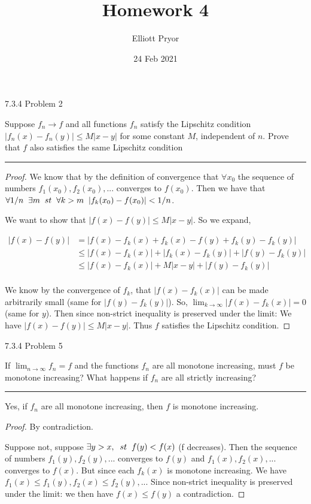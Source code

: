 \documentclass[11pt]{article}
\title{Homework 4}
\author{Elliott Pryor}
\date{24 Feb 2021}
\begin{document}
\maketitle

 7.3.4 Problem 2

Suppose $f_n \to f$ and all functions $f_n$ satisfy the Lipschitz condition
$|f_n(x) - f_n(y)| \leq M |x-y|$ for some constant $M$, independent of $n$.
Prove that $f$ also satisfies the same Lipschitz condition

\hrule


\begin{proof}
    We know that by the definition of convergence that $\forall x_0$ the sequence of numbers
    $f_1(x_0), f_2(x_0), ...$ converges to $f(x_0)$. Then we have that 
    $\forall 1/n \sp \exists m \sp st \sp \forall k > m \sp |f_k(x_0) - f(x_0) | < 1/n$.

    We want to show that $|f(x) - f(y)| \leq M |x-y|$. So we expand,

    \begin{align*}
        |f(x) - f(y)| &= |f(x) - f_k(x) + f_k(x) - f(y) + f_k(y) - f_k(y)| \\
        &\leq |f(x) - f_k(x)|  + |f_k(x) - f_k(y)| + |f(y) - f_k(y)|\\
        &\leq |f(x) - f_k(x)|  + M|x - y| + |f(y) - f_k(y)|\\
    \end{align*}

    We know by the convergence of $f_k$, that $|f(x) - f_k(x)|$ can be made arbitrarily small (same for $|f(y) - f_k(y)|$).
    So, $\lim_{k \to \infty} |f(x) - f_k(x)| = 0$ (same for $y$).
    Then since non-strict inequality is preserved under the limit: 
    We have $|f(x) - f(y)| \leq   M|x - y|$.
    Thus $f$ satisfies the Lipschitz condition.
\end{proof}







 7.3.4 Problem 5

If $\lim_{n \to \infty} f_n = f$ and the functions $f_n$ are all monotone increasing, must $f$ be monotone increasing?
What happens if $f_n$ are all strictly increasing?

\hrule

Yes, if $f_n$ are all monotone increasing, then $f$ is monotone increasing.

\begin{proof}
    By contradiction.

    Suppose not, suppose $\exists y > x, \sp st \sp f(y) < f(x)$ (f decreases).
    Then the sequence of numbers $f_1(y), f_2(y), ...$ converges to $f(y)$
    and $f_1(x), f_2(x), ...$ converges to $f(x)$. But since each $f_k(x)$ is monotone increasing.
    We have $f_1(x) \leq f_1(y), f_2(x) \leq f_2(y), ...$
    Since non-strict inequality is preserved under the limit: we then have $f(x) \leq f(y)$
    a contradiction.
\end{proof}
\end{document}
